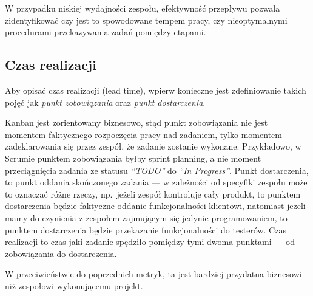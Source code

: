 W przypadku niskiej wydajności zespołu, efektywność przepływu pozwala zidentyfikować czy jest to spowodowane tempem pracy, czy nieoptymalnymi procedurami przekazywania zadań pomiędzy etapami.

\subsection{Czas realizacji}
Aby opisać czas realizacji (lead time), wpierw konieczne jest zdefiniowanie takich pojęć jak \textit{punkt zobowiązania} oraz \textit{punkt dostarczenia}.

Kanban jest zorientowany biznesowo, stąd punkt zobowiązania nie jest momentem faktycznego rozpoczęcia pracy nad zadaniem, tylko momentem zadeklarowania się przez zespół, że zadanie zostanie wykonane.
Przykładowo, w Scrumie punktem zobowiązania byłby sprint planning, a nie moment przeciągnięcia zadania ze statusu \textit{``TODO''} do \textit{``In Progress''}.
Punkt dostarczenia, to punkt oddania skończonego zadania --- w zależności od specyfiki zespołu może to oznaczać różne rzeczy, np.\ jeżeli zespół kontroluje cały produkt, to punktem dostarczenia
będzie faktyczne oddanie funkcjonalności klientowi, natomiast jeżeli mamy do czynienia z zespołem zajmującym się jedynie programowaniem, to punktem dostarczenia będzie przekazanie funkcjonalności do testerów.
Czas realizacji to czas jaki zadanie spędziło pomiędzy tymi dwoma punktami --- od zobowiązania do dostarczenia.

W przeciwieństwie do poprzednich metryk, ta jest bardziej przydatna biznesowi niż zespołowi wykonującemu projekt.
